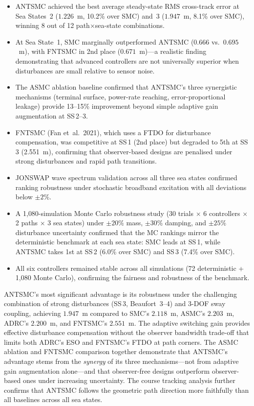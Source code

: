 \documentclass[review]{cas-dc}
\begin{document}
\begin{itemize}
    \item ANTSMC achieved the best average steady-state RMS cross-track error at Sea States~2 ($1.226$~m, 10.2\% over SMC) and~3 ($1.947$~m, 8.1\% over SMC), winning 8 out of 12 path$\times$sea-state combinations.
    \item At Sea State~1, SMC marginally outperformed ANTSMC ($0.666$ vs.\ $0.695$~m), with FNTSMC in 2nd place ($0.671$~m)---a realistic finding demonstrating that advanced controllers are not universally superior when disturbances are small relative to sensor noise.
    \item The ASMC ablation baseline confirmed that ANTSMC's three synergistic mechanisms (terminal surface, power-rate reaching, error-proportional leakage) provide 13--15\% improvement beyond simple adaptive gain augmentation at SS\,2--3.
    \item FNTSMC (Fan et~al.\ 2021), which uses a FTDO for disturbance compensation, was competitive at SS\,1 (2nd place) but degraded to 5th at SS\,3 (2.551~m), confirming that observer-based designs are penalised under strong disturbances and rapid path transitions.
    \item JONSWAP wave spectrum validation across all three sea states confirmed ranking robustness under stochastic broadband excitation with all deviations below $\pm 2\%$.
    \item A 1{,}080-simulation Monte Carlo robustness study (30 trials $\times$ 6 controllers $\times$ 2 paths $\times$ 3 sea states) under $\pm 20\%$ mass, $\pm 30\%$ damping, and $\pm 25\%$ disturbance uncertainty confirmed that the MC rankings mirror the deterministic benchmark at each sea state: SMC leads at SS\,1, while ANTSMC takes 1st at SS\,2 (6.0\% over SMC) and SS\,3 (7.4\% over SMC).
    \item All six controllers remained stable across all simulations (72 deterministic + 1{,}080 Monte Carlo), confirming the fairness and robustness of the benchmark.
\end{itemize}

ANTSMC's most significant advantage is its robustness under the challenging combination of strong disturbances (SS\,3, Beaufort~3--4) and 3-DOF sway coupling, achieving $1.947$~m compared to SMC's $2.118$~m, ASMC's $2.203$~m, ADRC's $2.200$~m, and FNTSMC's $2.551$~m. The adaptive switching gain provides effective disturbance compensation without the observer bandwidth trade-off that limits both ADRC's ESO and FNTSMC's FTDO at path corners. The ASMC ablation and FNTSMC comparison together demonstrate that ANTSMC's advantage stems from the \emph{synergy} of its three mechanisms---not from adaptive gain augmentation alone---and that observer-free designs outperform observer-based ones under increasing uncertainty. The course tracking analysis further confirms that ANTSMC follows the geometric path direction more faithfully than all baselines across all sea states.
\end{document}
